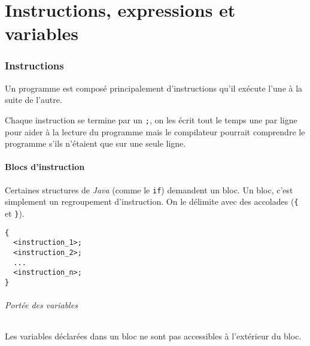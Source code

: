 

\usepackage{color}
\usepackage[usenames,dvipsnames,svgnames,table]{xcolor}

\usepackage{appendix}

\usepackage{listings}
\usepackage{numprint}



\newcommand{\java}{\emph{Java}}

\part{Instructions, expressions et variables}

\section{Instructions}
Un programme est composé principalement d'instructions qu'il exécute l'une à la
suite de l'autre.

Chaque instruction se termine par un \verb|;|, on les écrit tout le temps
une par ligne pour aider à la lecture du programme mais le compilateur
pourrait comprendre le programme s'ils n'étaient que sur une seule ligne.

\subsection{Blocs d'instruction}
Certaines structures de \java{} (comme le \verb|if|) demandent un bloc.
Un bloc, c'est simplement un regroupement d'instruction.
On le délimite avec des accolades
(\verb|{| et \verb|}|).
\begin{lstlisting}
{
  <instruction_1>;
  <instruction_2>;
  ...
  <instruction_n>;
}
\end{lstlisting}

\paragraph{Portée des variables}
Les variables déclarées dans un bloc ne sont pas accessibles à l'extérieur
du bloc.

